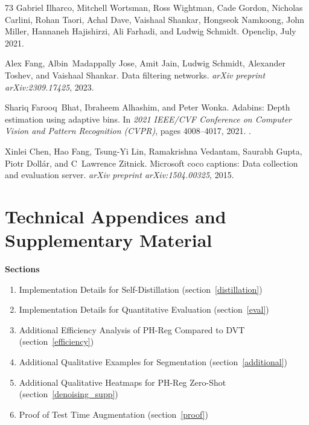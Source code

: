 \documentclass{article}
\begin{document}
\begin{thebibliography}{73}
Gabriel Ilharco, Mitchell Wortsman, Ross Wightman, Cade Gordon, Nicholas
  Carlini, Rohan Taori, Achal Dave, Vaishaal Shankar, Hongseok Namkoong, John
  Miller, Hannaneh Hajishirzi, Ali Farhadi, and Ludwig Schmidt.
\newblock Openclip, July 2021.

Alex Fang, Albin~Madappally Jose, Amit Jain, Ludwig Schmidt, Alexander Toshev,
  and Vaishaal Shankar.
\newblock Data filtering networks.
\newblock \emph{arXiv preprint arXiv:2309.17425}, 2023.

Shariq Farooq~Bhat, Ibraheem Alhashim, and Peter Wonka.
\newblock Adabins: Depth estimation using adaptive bins.
\newblock In \emph{2021 IEEE/CVF Conference on Computer Vision and Pattern
  Recognition (CVPR)}, pages 4008--4017, 2021.
\newblock {}.

Xinlei Chen, Hao Fang, Tsung-Yi Lin, Ramakrishna Vedantam, Saurabh Gupta, Piotr
  Doll{\'a}r, and C~Lawrence Zitnick.
\newblock Microsoft coco captions: Data collection and evaluation server.
\newblock \emph{arXiv preprint arXiv:1504.00325}, 2015.

\end{thebibliography}
 
\clearpage
\appendix
\section{Technical Appendices and Supplementary Material}
\renewcommand\thefigure{S.\arabic{figure}}    
\setcounter{figure}{0}
\renewcommand\thetable{S.\arabic{table}}   
\setcounter{table}{0}

\textbf{\Large Sections}

\begin{enumerate}
    \item Implementation Details for Self-Distillation (section~\ref{distillation})
    \item Implementation Details for Quantitative Evaluation (section~\ref{eval})
    \item Additional Efficiency Analysis of PH-Reg Compared to DVT (section~\ref{efficiency})
    \item Additional Qualitative Examples for Segmentation (section~\ref{additional})
    \item Additional Qualitative Heatmaps for PH-Reg Zero-Shot (section~\ref{denoising_supp})
    \item Proof of Test Time Augmentation  (section~\ref{proof})
\end{enumerate}
\newpage
\end{document}
